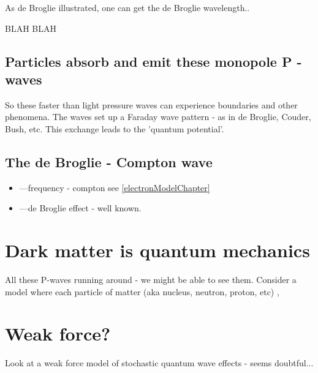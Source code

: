 \documentclass[../rzero]{subfiles}
\begin{document}
As de Broglie illustrated, one can get the de Broglie wavelength..

BLAH BLAH



\subsection{Particles absorb and emit these monopole P - waves}
So these faster than light pressure waves can experience boundaries and other phenomena. The waves set up a Faraday wave pattern - as in de Broglie, Couder, Bush, etc. This exchange leads to the 'quantum potential'. 




\subsection{The de Broglie - Compton wave}
\begin{itemize}
  \item ---frequency - compton see \ref{electronModelChapter}
  \item ---de Broglie effect - well known.
 \end{itemize}


\section{Dark matter is quantum mechanics}
	All these P-waves running around - we might be able to see them. Consider a model where each particle of matter (aka nucleus, neutron, proton, etc) , 

\section{Weak force?}
	Look at a weak force model of stochastic quantum wave effects - seems doubtful... 
\end{document}
